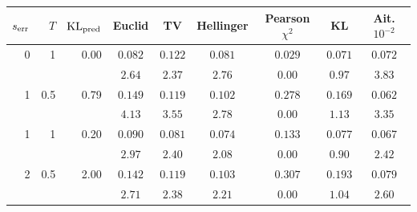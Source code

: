 \begin{tabular}{rrrcccccc}\toprule
$s_{\rm err}$ & $T$ & $\mathrm{KL}_{\rm pred}$ & Euclid & TV & Hellinger & Pearson $\chi^2$ & KL & Ait. $10^{-2}$\\\midrule
0 & 1 & 0.00 & $0.082$ & $0.122$ & $0.081$ & $\mathbf{0.029}$ & $0.071$ & $0.072$\\
 & & & $2.64$ & $2.37$ & $2.76$ & $\mathbf{0.00}$ & $0.97$ & $3.83$\\[-1pt]
1 & 0.5 & 0.79 & $0.149$ & $0.119$ & $0.102$ & $0.278$ & $0.169$ & $\mathbf{0.062}$\\
 & & & $4.13$ & $3.55$ & $2.78$ & $\mathbf{0.00}$ & $1.13$ & $3.35$\\[-1pt]
1 & 1 & 0.20 & $0.090$ & $0.081$ & $0.074$ & $0.133$ & $0.077$ & $\mathbf{0.067}$\\
 & & & $2.97$ & $2.40$ & $2.08$ & $\mathbf{0.00}$ & $0.90$ & $2.42$\\[-1pt]
2 & 0.5 & 2.00 & $0.142$ & $0.119$ & $0.103$ & $0.307$ & $0.193$ & $\mathbf{0.079}$\\
 & & & $2.71$ & $2.38$ & $2.21$ & $\mathbf{0.00}$ & $1.04$ & $2.60$\\[-1pt]
\bottomrule\end{tabular}
